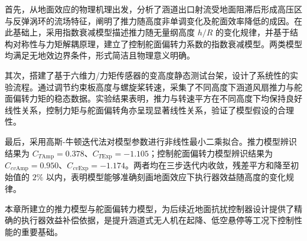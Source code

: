 首先，从地面效应的物理机理出发，分析了涵道出口射流受地面阻滞后形成高压区与反弹涡环的流场特征，阐明了推力随高度非单调变化及舵面效率降低的成因。在此基础上，采用指数衰减模型描述推力随无量纲高度 $h/R$ 的变化规律，并基于结构对称性与力矩解耦原理，建立了控制舵面偏转力系数的指数衰减模型。两类模型均满足无地效边界条件，形式简洁且物理意义明确。

其次，搭建了基于六维力/力矩传感器的变高度静态测试台架，设计了系统性的实验流程。通过调节约束板高度与螺旋桨转速，采集了不同高度下涵道风扇推力与舵面偏转力矩的稳态数据。实验结果表明，推力与转速平方在不同高度下均保持良好线性关系，控制力矩与舵面偏转角亦呈现显著线性关系，验证了模型假设的合理性。

最后，采用高斯-牛顿迭代法对模型参数进行非线性最小二乘拟合。推力模型辨识结果为 $C_{T\mathrm{Amp}} = 0.378$、$C_{T\mathrm{Exp}} = -1.105$；控制舵面偏转力模型辨识结果为 $C_{cv\mathrm{Amp}} = 0.950$、$C_{cv\mathrm{Exp}} = -1.174$。两者均在三步迭代内收敛，残差平方和降至初始值的 $2\%$ 以内，表明模型能够准确刻画地面效应下执行器效益随高度的变化规律。

本章所建立的推力模型与舵面偏转力模型，为后续近地面抗扰控制器设计提供了精确的执行器效益补偿依据，是提升涵道式无人机在起降、低空悬停等工况下控制性能的重要基础。